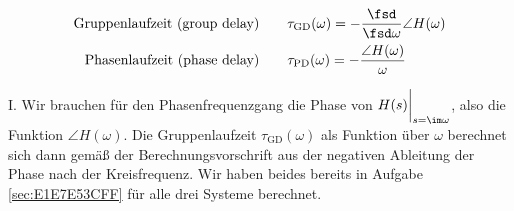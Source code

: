 \begin{Werkzeug}
\begin{align}
\text{Gruppenlaufzeit (group delay)}
\qquad&\tau_\mathrm{GD}(\omega) = -\frac{\fsd}{\fsd \omega} \angle H(\omega)\\
\text{Phasenlaufzeit (phase delay)}
\qquad&\tau_\mathrm{PD}(\omega) = -\frac{\angle H(\omega)}{\omega}
\end{align}
\end{Werkzeug}
\begin{Ansatz}
I. Wir brauchen für den Phasenfrequenzgang die
Phase von $H(s)\bigg|_{s=\im\omega}$, also die Funktion $\angle H(\omega)$.
Die Gruppenlaufzeit $\tau_\mathrm{GD}(\omega)$ als Funktion über $\omega$
berechnet sich dann gemäß der Berechnungsvorschrift aus der negativen Ableitung
der Phase nach der Kreisfrequenz.
Wir haben beides bereits in Aufgabe \ref{sec:E1E7E53CFF} für alle drei
Systeme berechnet.
\end{Ansatz}
